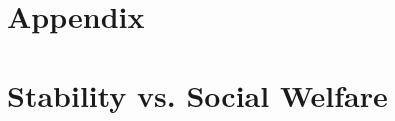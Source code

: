 \newpage
\section*{Appendix}
\setcounter{section}{0}
\setcounter{figure}{0}
\makeatletter 
\renewcommand{\thefigure}{A\@arabic\c@figure}
\makeatother
\setcounter{table}{0}
\renewcommand{\thetable}{A\arabic{table}}
\appendix

\section{Stability vs. Social Welfare}
